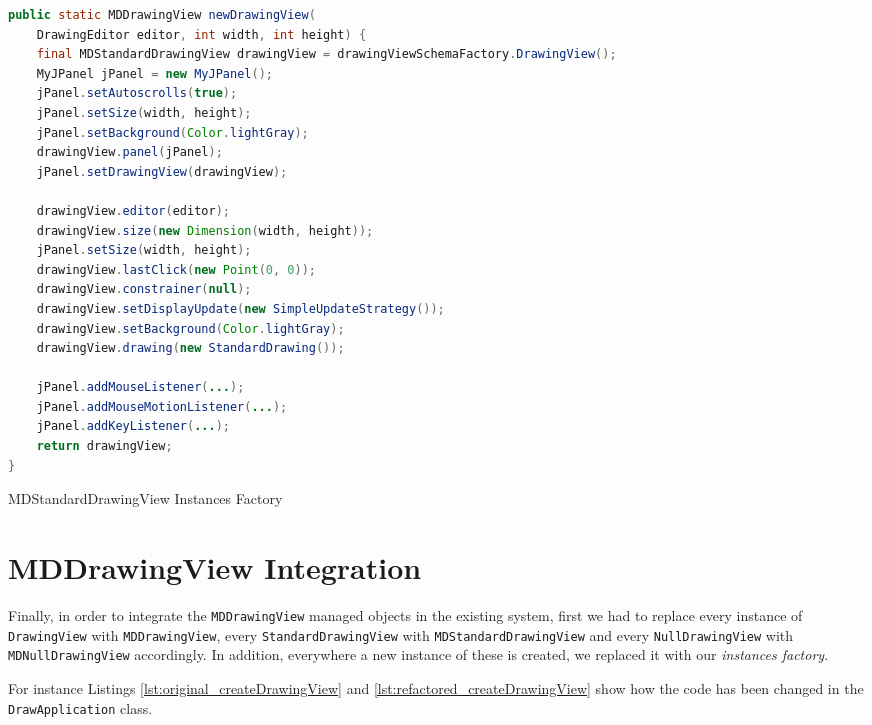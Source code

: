 \begin{sourcecode}[H]
	\begin{lstlisting}[language=Java, escapechar=|]
public static MDDrawingView newDrawingView(
	DrawingEditor editor, int width, int height) {
	final MDStandardDrawingView drawingView = drawingViewSchemaFactory.DrawingView();
	MyJPanel jPanel = new MyJPanel();
	jPanel.setAutoscrolls(true);
 	jPanel.setSize(width, height);
	jPanel.setBackground(Color.lightGray);
	drawingView.panel(jPanel);
	jPanel.setDrawingView(drawingView);

	drawingView.editor(editor);
	drawingView.size(new Dimension(width, height));
	jPanel.setSize(width, height);
	drawingView.lastClick(new Point(0, 0));
	drawingView.constrainer(null);
	drawingView.setDisplayUpdate(new SimpleUpdateStrategy());
	drawingView.setBackground(Color.lightGray);
	drawingView.drawing(new StandardDrawing());

	jPanel.addMouseListener(...);
	jPanel.addMouseMotionListener(...);
	jPanel.addKeyListener(...);
	return drawingView;
}
	\end{lstlisting}
	\label{lst:MDStandardDrawingView Instances Factory}
	\caption{MDStandardDrawingView Instances Factory}
\end{sourcecode}

\section{MDDrawingView Integration}
Finally, in order to integrate the \texttt{MDDrawingView} managed objects in the existing system, first we had to replace every instance of \texttt{DrawingView} with \texttt{MDDrawingView}, every \texttt{StandardDrawingView} with \texttt{MDStandardDrawingView} and every \texttt{NullDrawingView} with \texttt{MDNullDrawingView} accordingly.
In addition, everywhere a new instance of these is created, we replaced it with our \textit{instances factory}.

For instance Listings \ref{lst:original_createDrawingView} and \ref{lst:refactored_createDrawingView} show how the code has been changed in the \texttt{DrawApplication} class.


